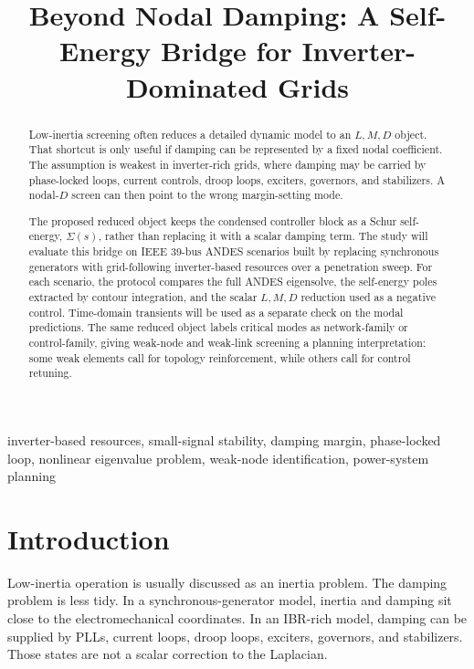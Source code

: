 \documentclass[conference,9pt]{IEEEtran}
\title{Beyond Nodal Damping: A Self-Energy Bridge for Inverter-Dominated Grids}
\author{
\IEEEauthorblockN{Jorge L. Mayorga Taborda}
\IEEEauthorblockA{\textit{Universidad de los Andes, Bogot\'a, Colombia}}
}
\begin{document}
\maketitle
\thispagestyle{empty}

\begin{abstract}
Low-inertia screening often reduces a detailed dynamic model to an \(L,M,D\) object. That shortcut is only useful if damping can be represented by a fixed nodal coefficient. The assumption is weakest in inverter-rich grids, where damping may be carried by phase-locked loops, current controls, droop loops, exciters, governors, and stabilizers. A nodal-\(D\) screen can then point to the wrong margin-setting mode.

The proposed reduced object keeps the condensed controller block as a Schur self-energy, \(\Sigma(s)\), rather than replacing it with a scalar damping term. The study will evaluate this bridge on IEEE 39-bus ANDES scenarios built by replacing synchronous generators with grid-following inverter-based resources over a penetration sweep. For each scenario, the protocol compares the full ANDES eigensolve, the self-energy poles extracted by contour integration, and the scalar \(L,M,D\) reduction used as a negative control. Time-domain transients will be used as a separate check on the modal predictions. The same reduced object labels critical modes as network-family or control-family, giving weak-node and weak-link screening a planning interpretation: some weak elements call for topology reinforcement, while others call for control retuning.
\end{abstract}

\begin{IEEEkeywords}
inverter-based resources, small-signal stability, damping margin, phase-locked loop, nonlinear eigenvalue problem, weak-node identification, power-system planning
\end{IEEEkeywords}

\section{Introduction}

Low-inertia operation is usually discussed as an inertia problem. The damping problem is less tidy. In a synchronous-generator model, inertia and damping sit close to the electromechanical coordinates. In an IBR-rich model, damping can be supplied by PLLs, current loops, droop loops, exciters, governors, and stabilizers. Those states are not a scalar correction to the Laplacian.
\end{document}
